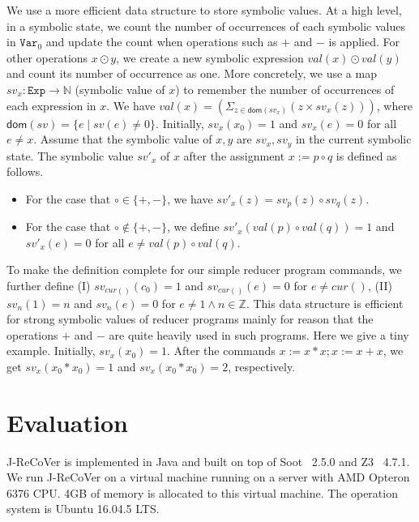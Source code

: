 \documentclass{llncs}
\newcommand{\Var}{\mathtt{Var}}
\newcommand{\Exp}{\mathtt{Exp}}
\newcommand{\cur}{cur()}
\newcommand{\dom}[1]{\mathsf{dom}(#1)}
\newcommand{\Z}{\mathbb{Z}}
\begin{document}
We use a more efficient data structure to store symbolic values. At a high level, in a symbolic state, we count the number of occurrences of each symbolic values in $\Var_0$ and update the count when operations such as $+$ and $-$ is applied. For other operations $x\odot y$, we create a new symbolic expression $val(x) \odot val(y)$ and count its number of occurrence as one.
More concretely, we use a map $sv_x:\Exp\rightarrow \mathbb{N}$ (symbolic value of $x$) to remember the number of occurrences of each expression in $x$. We have $val(x)= (\Sigma_{z\in \dom{sv_x}} (z\times sv_x(z)) )$, where $\dom{sv}=\{e\mid sv(e)\neq 0\}$.
Initially, $sv_x(x_0) = 1$ and $sv_x (e) =0$ for all $e\neq x$. Assume that the symbolic value of $x,y$ are $sv_x,sv_y$ in the current symbolic state. The symbolic value $sv'_x$ of $x$ after the assignment $x:=p\circ q$ is defined as follows.

\begin{itemize}
	\item For the case that $\circ \in\{+,-\}$, we have $sv'_x(z) = sv_p(z)\circ  sv_q(z)$.
	\item For the case that $\circ \notin\{+,-\}$, we define $sv'_x(val(p) \circ val(q)) =1$ and $sv'_x(e) = 0$ for all $e\neq val(p) \circ val(q)$.
\end{itemize}
To make the definition complete for our simple reducer program commands, we further define (I) $sv_{\cur}(c_0) =1$ and $sv_{\cur}(e)=0$ for $e\neq \cur$, (II) $sv_{n}(1) =n$ and $sv_{n}(e)=0$ for $e\neq 1 \wedge n\in \Z$.
This data structure is efficient for strong symbolic values of reducer programs mainly for reason that the operations $+$ and $-$ are quite heavily used in such programs. 
Here we give a tiny example. Initially, $sv_x(x_0)=1$. After the commands $x:=x*x;x:=x+x$, we get $sv_x(x_0*x_0)=1$ and $sv_x(x_0*x_0)=2$, respectively.  

\section{Evaluation}
\label{section:exp}
J-ReCoVer is implemented in Java and built on top of Soot~\cite{soot} 2.5.0 and Z3~\cite{z3} 4.7.1. We run J-ReCoVer on a virtual machine running on a server with AMD Opteron 6376 CPU. 4GB of memory is allocated to this virtual machine. The operation system is Ubuntu 16.04.5 LTS. 
\end{document}
